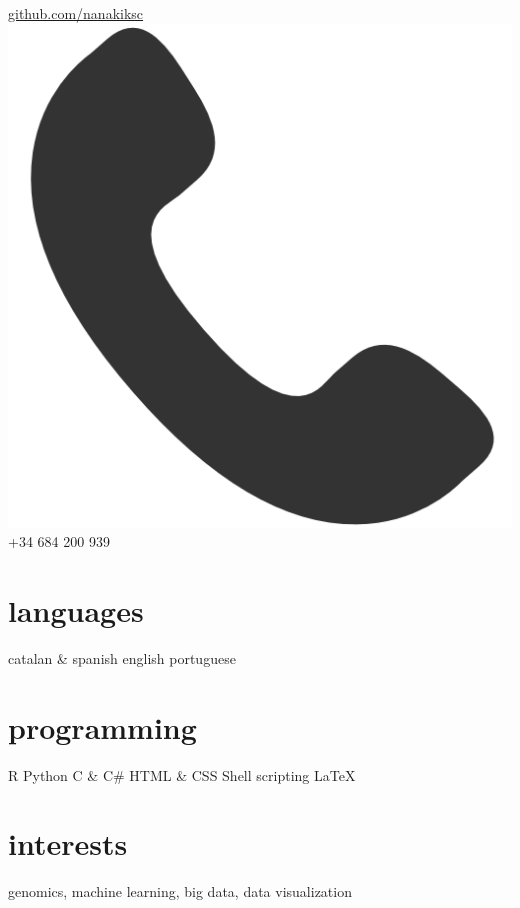 \documentclass[]{friggeri-cv} %
\begin{document}
\begin{aside}
  \href{https://github.com/nanakiksc}{github.com/nanakiksc}
  \includegraphics[scale=0.6]{phonelogo.png}
  +34 684 200 939

  \section{languages}
  catalan \& spanish
  english
  portuguese
  \section{programming}
  {\color{red} \FA \faHeart} R
  Python
  C \& C\#
  HTML \& CSS
  Shell scripting
  \LaTeX
\end{aside}


\section{interests}

genomics, machine learning, big data, data visualization

\end{document}
